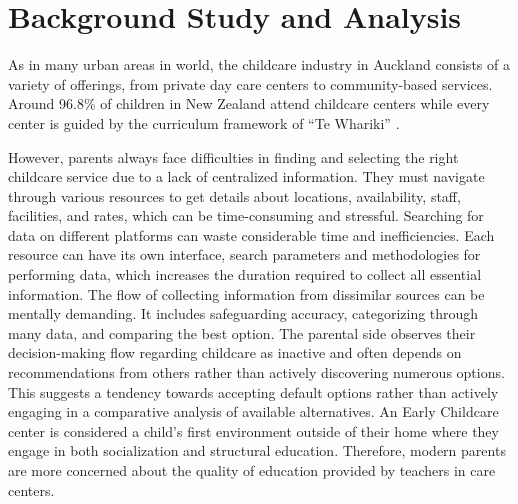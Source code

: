 
\section{Background Study and Analysis}

As in many urban areas in world, the childcare industry in Auckland consists of a variety of offerings, from private day care centers to community-based services. Around 96.8\% of children in New Zealand attend childcare centers while every center is guided by the curriculum framework of “Te Whariki” \cite{ministryofeducation_2023}. 

However, parents always face difficulties in finding and selecting the right childcare service due to a lack of centralized information. They must navigate through various resources to get details about locations, availability, staff, facilities, and rates, which can be time-consuming and stressful. Searching for data on different platforms can waste considerable time and inefficiencies. Each resource can have its own interface, search parameters and methodologies for performing data, which increases the duration required to collect all essential information. The flow of collecting information from dissimilar sources can be mentally demanding. It includes safeguarding accuracy, categorizing through many data, and comparing the best option. The parental side observes their decision-making flow regarding childcare as inactive and often depends on recommendations from others rather than actively discovering numerous options. This suggests a tendency towards accepting default options rather than actively engaging in a comparative analysis of available alternatives. An Early Childcare center is considered a child’s first environment outside of their home where they engage in both socialization and structural education. Therefore, modern parents are more concerned about the quality of education provided by teachers in care centers.
